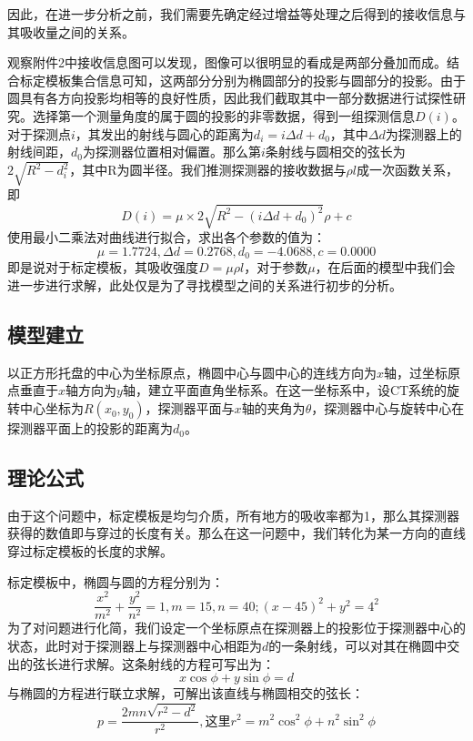 \documentclass{myart}
\begin{document}
因此，在进一步分析之前，我们需要先确定经过增益等处理之后得到的接收信息与其吸收量之间的关系。

观察附件2中接收信息图可以发现，图像可以很明显的看成是两部分叠加而成。结合标定模板集合信息可知，这两部分分别为椭圆部分的投影与圆部分的投影。由于圆具有各方向投影均相等的良好性质，因此我们截取其中一部分数据进行试探性研究。选择第一个测量角度的属于圆的投影的非零数据，得到一组探测信息\(D(i)\)。对于探测点\(i\)，其发出的射线与圆心的距离为\(d_i = i\Delta d + d_0\)，其中\(\Delta d\)为探测器上的射线间距，\(d_0\)为探测器位置相对偏置。那么第\(i\)条射线与圆相交的弦长为\(2\sqrt{R^2 - d_i^2}\)，其中R为圆半径。我们推测探测器的接收数据与\(\rho l\)成一次函数关系，即
\begin{equation}
D(i)  = \mu\times 2\sqrt{R^2 - ( i\Delta d + d_0)^2}\rho  +c
\end{equation}
使用最小二乘法对曲线进行拟合，求出各个参数的值为：
\[\mu =1.7724 , \Delta d = 0.2768, d_0 = -4.0688, c = 0.0000\]
即是说对于标定模板，其吸收强度\(D = \mu\rho l\)，对于参数\(\mu\)，在后面的模型中我们会进一步进行求解，此处仅是为了寻找模型之间的关系进行初步的分析。

\subsection{模型建立}

以正方形托盘的中心为坐标原点，椭圆中心与圆中心的连线方向为\(x\)轴，过坐标原点垂直于\(x\)轴方向为\(y\)轴，建立平面直角坐标系。在这一坐标系中，设CT系统的旋转中心坐标为\(R(x_0,y_0)\)，探测器平面与\(x\)轴的夹角为\(\theta\)，探测器中心与旋转中心在探测器平面上的投影的距离为\(d_0\)。

\subsection{理论公式}
由于这个问题中，标定模板是均匀介质，所有地方的吸收率都为1，那么其探测器获得的数值即与穿过的长度有关。那么在这一问题中，我们转化为某一方向的直线穿过标定模板的长度的求解。

标定模板中，椭圆与圆的方程分别为：
\[\frac{x^2}{m^2} + \frac{y^2}{n^2} = 1,m = 15,n = 40;(x - 45)^2 + y^2 = 4^2\]
为了对问题进行化简，我们设定一个坐标原点在探测器上的投影位于探测器中心的状态，此时对于探测器上与探测器中心相距为\(d\)的一条射线，可以对其在椭圆中交出的弦长进行求解。这条射线的方程可写出为：
\[x\cos\phi + y\sin\phi = d\]
与椭圆的方程进行联立求解，可解出该直线与椭圆相交的弦长：
\[ p = \frac{2mn\sqrt{r^2 - d^2}}{r^2},\text{这里} r^2 = m^2\cos^2\phi + n^2\sin^2\phi\]
\end{document}
